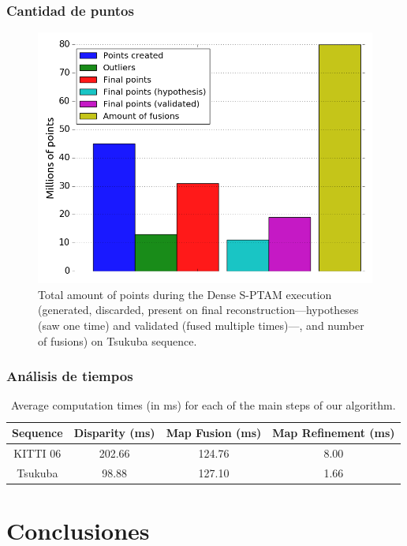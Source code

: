 \documentclass[compress]{beamer}
\begin{document}
\begin{frame}
	\frametitle{Cantidad de puntos}
\begin{figure}[!htb]
	\centering
	\includegraphics[width=\columnwidth]{images/points_tsukuba}
	\caption{Total amount of points during the Dense S-PTAM execution (generated, discarded, present on final reconstruction---hypotheses (saw one time) and validated (fused multiple times)---, and number of fusions) on Tsukuba sequence.}
	\label{fig:points_tsukuba}
\end{figure}
\end{frame}

\begin{frame}
	\frametitle{Análisis de tiempos}
	\begin{table}[!htb]
		\centering
		\small
		\begin{tabular}{cccc}
			\toprule
			Sequence & Disparity (ms) & Map Fusion (ms) & Map Refinement (ms) \\
			\midrule
			KITTI 06 & 202.66 & 124.76 & 8.00 \\
			Tsukuba & 98.88 & 127.10 & 1.66 \\
			\bottomrule
		\end{tabular}
		\caption{Average computation times (in ms) for each of the main steps of our algorithm.} \label{table:table_times}
	\end{table}
\end{frame}

\section{Conclusiones}
\end{document}
